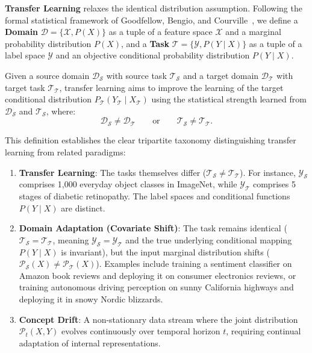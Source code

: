 \textbf{Transfer Learning} relaxes the identical distribution assumption. Following the formal statistical framework of Goodfellow, Bengio, and Courville~\cite{goodfellow2016deep}, we define a \textbf{Domain} $\mathcal{D} = \{\mathcal{X}, P(X)\}$ as a tuple of a feature space $\mathcal{X}$ and a marginal probability distribution $P(X)$, and a \textbf{Task} $\mathcal{T} = \{\mathcal{Y}, P(Y \mid X)\}$ as a tuple of a label space $\mathcal{Y}$ and an objective conditional probability distribution $P(Y \mid X)$.

\begin{definition}
Given a source domain $\mathcal{D}_{\mathcal{S}}$ with source task $\mathcal{T}_{\mathcal{S}}$ and a target domain $\mathcal{D}_{\mathcal{T}}$ with target task $\mathcal{T}_{\mathcal{T}}$, transfer learning aims to improve the learning of the target conditional distribution $P_{\mathcal{T}}(Y_{\mathcal{T}} \mid X_{\mathcal{T}})$ using the statistical strength learned from $\mathcal{D}_{\mathcal{S}}$ and $\mathcal{T}_{\mathcal{S}}$, where:
\begin{equation}
\mathcal{D}_{\mathcal{S}} \neq \mathcal{D}_{\mathcal{T}} \qquad \text{or} \qquad \mathcal{T}_{\mathcal{S}} \neq \mathcal{T}_{\mathcal{T}}.
\end{equation}
\end{definition}

This definition establishes the clear tripartite taxonomy distinguishing transfer learning from related paradigms:
\begin{enumerate}[leftmargin=*]
  \item \textbf{Transfer Learning}: The tasks themselves differ ($\mathcal{T}_{\mathcal{S}} \neq \mathcal{T}_{\mathcal{T}}$). For instance, $\mathcal{Y}_{\mathcal{S}}$ comprises 1,000 everyday object classes in ImageNet, while $\mathcal{Y}_{\mathcal{T}}$ comprises 5 stages of diabetic retinopathy. The label spaces and conditional functions $P(Y \mid X)$ are distinct.
  \item \textbf{Domain Adaptation (Covariate Shift)}: The task remains identical ($\mathcal{T}_{\mathcal{S}} = \mathcal{T}_{\mathcal{T}}$, meaning $\mathcal{Y}_{\mathcal{S}} = \mathcal{Y}_{\mathcal{T}}$ and the true underlying conditional mapping $P(Y \mid X)$ is invariant), but the input marginal distribution shifts ($\mathcal{P}_{\mathcal{S}}(X) \neq \mathcal{P}_{\mathcal{T}}(X)$). Examples include training a sentiment classifier on Amazon book reviews and deploying it on consumer electronics reviews, or training autonomous driving perception on sunny California highways and deploying it in snowy Nordic blizzards.
  \item \textbf{Concept Drift}: A non-stationary data stream where the joint distribution $\mathcal{P}_t(X, Y)$ evolves continuously over temporal horizon $t$, requiring continual adaptation of internal representations.
\end{enumerate}


